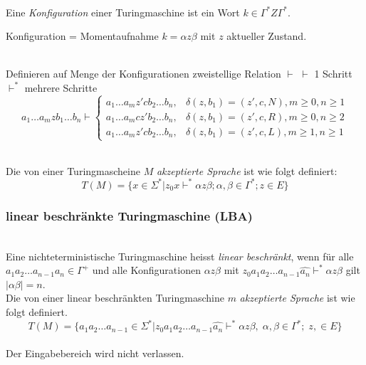 \documentclass{scrartcl}
\begin{document}
\begin{shaded}
    \ \\Eine \emph{Konfiguration} einer Turingmaschine ist ein Wort $k\in\Gamma^* Z\Gamma^*$.
\end{shaded}
{\tiny Konfiguration = Momentaufnahme $k=\alpha z\beta$ mit $z$ aktueller Zustand.}
\begin{shaded}
    \ \\Definieren auf Menge der Konfigurationen zweistellige Relation $\vdash$
    {\tiny $\vdash$ 1 Schritt \\ $\vdash^*$ mehrere Schritte }
    \[ a_1\dots a_mzb_1\dots b_n\vdash
    \begin{cases}
        a_1\dots a_mz'cb_2\dots b_n, & \delta(z,b_1)=(z',c,N), m\geq0, n\geq1 \\
        a_1\dots a_mcz'b_2\dots b_n, & \delta(z,b_1)=(z',c,R), m\geq0, n\geq2 \\
        a_1\dots a_mz'cb_2\dots b_n, & \delta(z,b_1)=(z',c,L), m\geq1, n\geq1
    \end{cases}
     \]
\end{shaded}

\begin{shaded}
    \ \\Die von einer Turingmascheine $M$ \emph{akzeptierte Sprache} ist wie folgt definiert: \[ T(M)=\{x\in\Sigma^* | z_0x\vdash^*\alpha z\beta; \alpha,\beta\in\Gamma^*; z\in E\} \]
\end{shaded}

\subsubsection*{linear beschränkte Turingmaschine (LBA)}
\begin{shaded}
    \ \\Eine nichteterministische Turingmaschine heisst \emph{linear beschränkt}, wenn für alle $a_1a_2\dots a_{n-1}a_n\in\Gamma^+$ und alle Konfigurationen $\alpha z\beta$ mit $z_0a_1a_2\dots a_{n-1}\hat{a_n}\vdash^*\alpha z\beta$ gilt $|\alpha\beta|=n$.\\
    Die von einer linear beschränkten Turingmaschine $m$ \emph{akzeptierte Sprache} ist wie folgt definiert.
    \[
    T(M) = \{a_1a_2\dots a_{n-1}\in\Sigma^* | z_0a_1a_2\dots a_{n-1}\hat{a_n}\vdash^*\alpha z\beta,\; \alpha,\beta\in\Gamma^*; \;z,\in E\}
    \]
    \\ {\tiny Der Eingabebereich wird nicht verlassen.}
\end{shaded}
\end{document}
